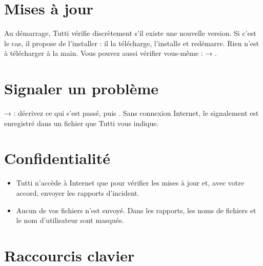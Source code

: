 \section{Mises à jour}

Au démarrage, Tutti vérifie discrètement s'il existe une nouvelle version. Si c'est le cas, il
propose de l'installer : il la télécharge, l'installe et redémarre. Rien n'est à télécharger
à la main. Vous pouvez aussi vérifier vous-même :  → .

\section{Signaler un problème}

 →  : décrivez ce qui s'est passé, puis .
Sans connexion Internet, le signalement est enregistré dans un fichier que Tutti vous indique.

\section{Confidentialité}

\begin{itemize}
\item Tutti n'accède à Internet que pour vérifier les mises à jour et, avec votre accord, envoyer
      les rapports d'incident.
\item Aucun de vos fichiers n'est envoyé. Dans les rapports, les noms de fichiers et le nom
      d'utilisateur sont masqués.
\end{itemize}

\section{Raccourcis clavier}

